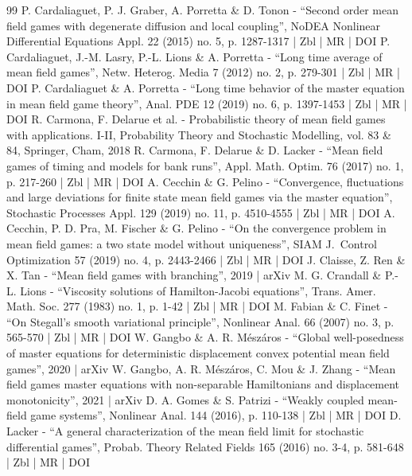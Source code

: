 \begin{thebibliography}{99}
P. Cardaliaguet, P. J. Graber, A. Porretta \& D. Tonon - “Second order mean field games with degenerate diffusion and local coupling”, NoDEA Nonlinear Differential Equations Appl. 22 (2015) no. 5, p. 1287-1317 | Zbl | MR | DOI
P. Cardaliaguet, J.-M. Lasry, P.-L. Lions \& A. Porretta - “Long time average of mean field games”, Netw. Heterog. Media 7 (2012) no. 2, p. 279-301 | Zbl | MR | DOI
P. Cardaliaguet \& A. Porretta - “Long time behavior of the master equation in mean field game theory”, Anal. PDE 12 (2019) no. 6, p. 1397-1453 | Zbl | MR | DOI
R. Carmona, F. Delarue et al. - Probabilistic theory of mean field games with applications. I-II, Probability Theory and Stochastic Modelling, vol. 83 \& 84, Springer, Cham, 2018
R. Carmona, F. Delarue \& D. Lacker - “Mean field games of timing and models for bank runs”, Appl. Math. Optim. 76 (2017) no. 1, p. 217-260 | Zbl | MR | DOI
A. Cecchin \& G. Pelino - “Convergence, fluctuations and large deviations for finite state mean field games via the master equation”, Stochastic Processes Appl. 129 (2019) no. 11, p. 4510-4555 | Zbl | MR | DOI
A. Cecchin, P. D. Pra, M. Fischer \& G. Pelino - “On the convergence problem in mean field games: a two state model without uniqueness”, SIAM J. Control Optimization 57 (2019) no. 4, p. 2443-2466 | Zbl | MR | DOI
J. Claisse, Z. Ren \& X. Tan - “Mean field games with branching”, 2019 | arXiv
M. G. Crandall \& P.-L. Lions - “Viscosity solutions of Hamilton-Jacobi equations”, Trans. Amer. Math. Soc. 277 (1983) no. 1, p. 1-42 | Zbl | MR | DOI
M. Fabian \& C. Finet - “On Stegall’s smooth variational principle”, Nonlinear Anal. 66 (2007) no. 3, p. 565-570 | Zbl | MR | DOI
W. Gangbo \& A. R. Mészáros - “Global well-posedness of master equations for deterministic displacement convex potential mean field games”, 2020 | arXiv
W. Gangbo, A. R. Mészáros, C. Mou \& J. Zhang - “Mean field games master equations with non-separable Hamiltonians and displacement monotonicity”, 2021 | arXiv
D. A. Gomes \& S. Patrizi - “Weakly coupled mean-field game systems”, Nonlinear Anal. 144 (2016), p. 110-138 | Zbl | MR | DOI
D. Lacker - “A general characterization of the mean field limit for stochastic differential games”, Probab. Theory Related Fields 165 (2016) no. 3-4, p. 581-648 | Zbl | MR | DOI

\end{thebibliography}
